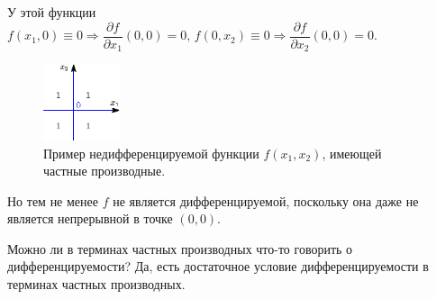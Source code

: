 \documentclass[12pt]{article}
\theoremstyle{definition}
\begin{document}
У этой функции $f(x_1,0) \equiv 0 \Rightarrow \dfrac{\partial f}{\partial x_1}(0,0) = 0, \, f(0,x_2) \equiv 0 \Rightarrow\dfrac{\partial f}{\partial x_2}(0,0) = 0$. 
\begin{figure}[H]
	\centering
	\includegraphics[width=0.2\textwidth]{13_1.eps}
	\caption{Пример недифференцируемой функции $f(x_1,x_2)$, имеющей частные производные.}
	\label{13_1}
\end{figure}
Но тем не менее $f$ не является дифференцируемой, поскольку она даже не является непрерывной в точке $(0,0)$.

Можно ли в терминах частных производных что-то говорить о дифференцируемости? Да, есть достаточное условие дифференцируемости в терминах частных производных.
\end{document}

